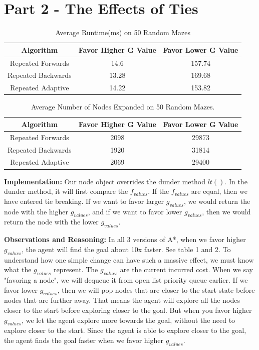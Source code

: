\documentclass[10pt]{article}
\begin{document}
\section*{Part 2 - The Effects of Ties}
\begin{table}[h!]
\centering
\begin{tabular}{||c c c ||} 
 \hline
 Algorithm & Favor Higher G Value & Favor Lower G Value \\ [0.5ex] 
 \hline\hline
 Repeated Forwards & 14.6 & 157.74 \\ 
 Repeated Backwards & 13.28 & 169.68 \\ 
 Repeated Adaptive & 14.22 &  153.82 \\ 
 \hline
\end{tabular}
\caption{Average Runtime(ms) on 50 Random Mazes}
\label{table:1}
\end{table}
\begin{table}[h!]
\centering
\begin{tabular}{||c c c ||} 
 \hline
 Algorithm & Favor Higher G Value & Favor Lower G Value \\ [0.5ex] 
 \hline\hline
 Repeated Forwards & 2098 & 29873 \\ 
 Repeated Backwards & 1920 & 31814 \\ 
 Repeated Adaptive & 2069 &  29400 \\ 
 \hline
\end{tabular}
\caption{ Average Number of Nodes Expanded on 50 Random Mazes.}
\label{table:2}
\end{table}


\textbf{Implementation:} Our node object overrides the dunder method ${lt()}$. In the dunder method, it will first compare the $f_{values}$. If the $f_{values}$ are equal, then we have entered tie breaking. If we want to favor larger $g_{values}$, we would return the node with the higher $g_{values}$, and if we want to favor lower $g_{values}$, then we would return the node with the lower $g_{values}$. 

\textbf{Observations and Reasoning:} In all 3 versions of A*, when we favor higher $g_{values}$, the agent will find the goal about 10x faster. See table 1 and 2. To understand how one simple change can have such a massive effect, we must know what the $g_{values}$ represent. The $g_{values}$ are the current incurred cost. When we say "favoring a node", we will dequeue it from open list priority queue earlier. If we favor lower $g_{values}$, then we will pop nodes that are closer to the start state before nodes that are further away. That means the agent will explore all the nodes closer to the start before exploring closer to the goal. But when you favor higher $g_{values}$, we let the agent explore more towards the goal, without the need to explore closer to the start. Since the agent is able to explore closer to the goal, the agent finds the goal faster when we favor higher $g_{values}$.
\end{document}
